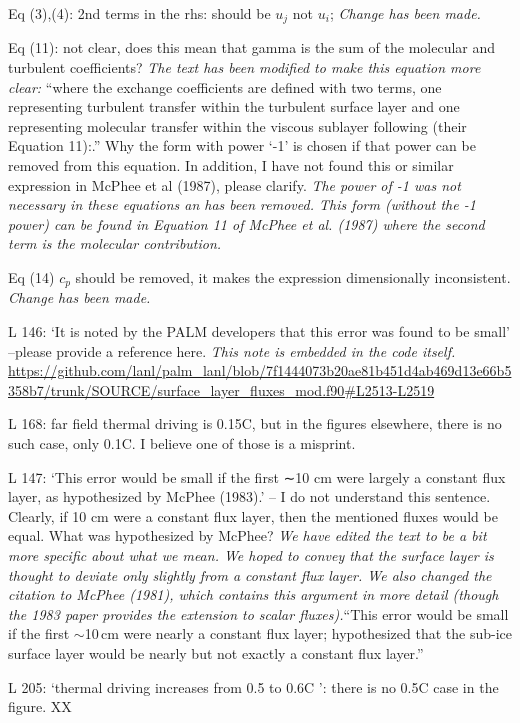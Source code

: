 \documentclass[tc, manuscript]{copernicus}
\begin{document}
Eq (3),(4): 2nd terms in the rhs: should be $u_j$ not $u_i$;
\textit{Change has been made.}

Eq (11): not clear, does this mean that gamma is the sum of the molecular and turbulent coefficients? 
\textit{The text has been modified to make this equation more clear:}
``where the exchange coefficients are defined with two terms, one representing turbulent transfer within the turbulent surface layer and one representing molecular transfer within the viscous sublayer following \citet{mcphee_dynamics_1987} (their Equation 11):.''
Why the form with power ‘-1’ is chosen if that power can be removed from this equation. In addition, I have not found this or similar expression in McPhee et al (1987), please clarify.
\textit{The power of -1 was not necessary in these equations an has been removed. This form (without the -1 power) can be found in Equation 11 of McPhee et al. (1987) where the second term is the molecular contribution.}

Eq (14) $c_p$ should be removed, it makes the expression dimensionally inconsistent.
\textit{Change has been made.}

L 146: ‘It is noted by the PALM developers that this error was found to be small’ –please provide a reference here.
\textit{This note is embedded in the code itself.}
\url{https://github.com/lanl/palm_lanl/blob/7f1444073b20ae81b451d4ab469d13e66b5358b7/trunk/SOURCE/surface_layer_fluxes_mod.f90#L2513-L2519}

L 168: far field thermal driving is 0.15C, but in the figures elsewhere, there is no such case, only 0.1C. I believe one of those is a misprint.

L 147: ‘This error would be small if the first ∼10 cm were largely a constant flux layer, as hypothesized by McPhee (1983).’ – I do not understand this sentence. Clearly, if 10 cm were a constant flux layer, then the mentioned fluxes would be equal. What was hypothesized by McPhee?
\textit{We have edited the text to be a bit more specific about what we mean. We hoped to convey that the surface layer is thought to deviate only slightly from a constant flux layer. We also changed the citation to McPhee (1981), which contains this argument in more detail (though the 1983 paper provides the extension to scalar fluxes).}``This error would be small if the first $\sim$10\,\unit{cm} were nearly a constant flux layer; \citet{mcphee_analytic_1981} hypothesized that the sub-ice surface layer would be nearly but not exactly a constant flux layer.''

L 205: ‘thermal driving increases from 0.5 to 0.6C ’: there is no 0.5C case in the figure.
XX
\end{document}
